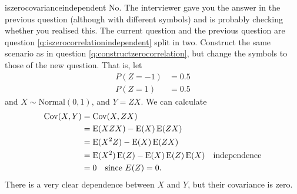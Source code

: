 \begin{answer}{iszerocovarianceindependent}
No. The interviewer gave you the answer in the previous question
(although with different symbols)
and is probably checking whether you realised this.
The current question and the previous question are question \ref{q:iszerocorrelationindependent} split in two.
Construct the same scenario as in question \ref{q:constructzerocorrelation}, but change the symbols to those of the new question.
That is, let
\begin{align*}
P(Z = -1) &= 0.5  \\
P(Z =  1) &= 0.5
\end{align*}
and
$X \sim \text{Normal}(0,1)$, and
$Y = ZX$.
We can calculate
\begin{align*}
\operatorname{\mathrm{Cov}}(X,Y)
&= \operatorname{\mathrm{Cov}}(X, ZX) \\
&= \operatorname{\mathrm{E}}(XZX) - \operatorname{\mathrm{E}}(X) \operatorname{\mathrm{E}}(ZX)  \\
&= \operatorname{\mathrm{E}}(X^2 Z) - \operatorname{\mathrm{E}}(X) \operatorname{\mathrm{E}}(ZX)  \\
&= \operatorname{\mathrm{E}}(X^2) \operatorname{\mathrm{E}}(Z) - \operatorname{\mathrm{E}}(X)\operatorname{\mathrm{E}}(Z)\operatorname{\mathrm{E}}(X)   \quad \text{independence} \\
&=  0                                \quad \text{since } E(Z)=0
\text{.}
\end{align*}
There is a very clear dependence between $X$ and $Y$, but their covariance is zero.
\end{answer}
